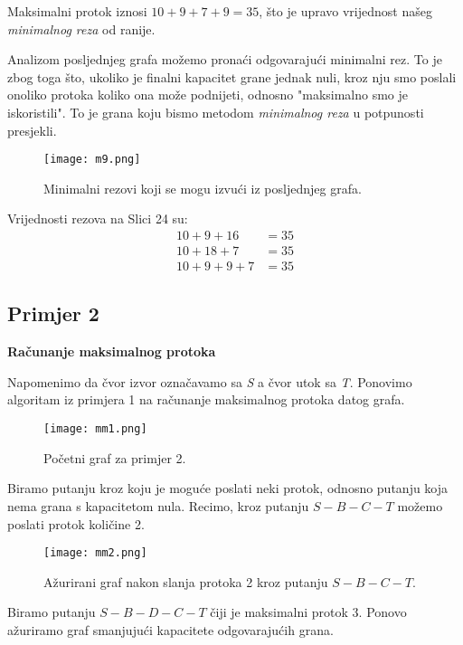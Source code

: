 \documentclass[11pt, a4paper]{article}
\begin{document}
	
	Maksimalni protok iznosi $10+9+7+9=35$, što je upravo vrijednost našeg \textit{minimalnog reza} od ranije.
	
	Analizom posljednjeg grafa možemo pronaći odgovarajući minimalni rez. To je zbog toga što, ukoliko je finalni kapacitet grane jednak nuli, kroz nju smo poslali onoliko protoka koliko ona može podnijeti, odnosno "maksimalno smo je iskoristili". To je grana koju bismo metodom \textit{minimalnog reza} u potpunosti presjekli.
	
	\begin{figure}[h]
		\centering
		\texttt{[image: m9.png]}
		\caption{Minimalni rezovi koji se mogu izvući iz posljednjeg grafa.}
		\label{fig:m9}
	\end{figure}
	
	Vrijednosti rezova na Slici 24 su:
	\begin{align*}
		10+9+16&=35\\
		10+18+7&=35\\
		10+9+9+7&=35
	\end{align*}
	
	\newpage
	\subsection{Primjer 2}
	
	\textbf{Računanje maksimalnog protoka}
	
	Napomenimo da čvor izvor označavamo sa \textit{S} a čvor utok sa \textit{T}. Ponovimo algoritam iz primjera 1 na računanje maksimalnog protoka datog grafa.
	
	\begin{figure}[h]
		\centering
		\texttt{[image: mm1.png]}
		\caption{Početni graf za primjer 2.}
		\label{fig:mm1}
	\end{figure}
	
	Biramo putanju kroz koju je moguće poslati neki protok, odnosno putanju koja nema grana s kapacitetom nula. Recimo, kroz putanju $S-B-C-T$ možemo poslati protok količine 2.
	
	\begin{figure}[h]
		\centering
		\texttt{[image: mm2.png]}
		\caption{Ažurirani graf nakon slanja protoka 2 kroz putanju $S-B-C-T$.}
		\label{fig:mm2}
	\end{figure}
	
	Biramo putanju $S-B-D-C-T$ čiji je maksimalni protok 3. Ponovo ažuriramo graf smanjujući kapacitete odgovarajućih grana.
	
\end{document}
